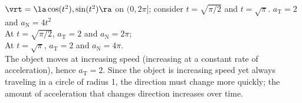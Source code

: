 {$\vrt = \la \cos (t^2),\sin (t^2) \ra$ on $(0,2\pi]$; consider $t=\sqrt{\pi/2}$ and $t=\sqrt{\pi}$.
}
{$a_{\text{T}} = 2$ and $a_{\text{N}} = 4t^2$\\
At $t=\sqrt{\pi/2}$, $a_{\text{T}} = 2$ and $a_{\text{N}} = 2\pi$;\\
At $t=\sqrt{\pi}$, $a_{\text{T}} = 2$ and $a_{\text{N}} = 4\pi$.\\
The object moves at increasing speed (increasing at a constant rate of acceleration), hence $a_{\text{T}}=2$. Since the object is increasing speed yet always traveling in a circle of radius 1, the direction must change more quickly; the amount of acceleration that changes direction increases over time. 
}